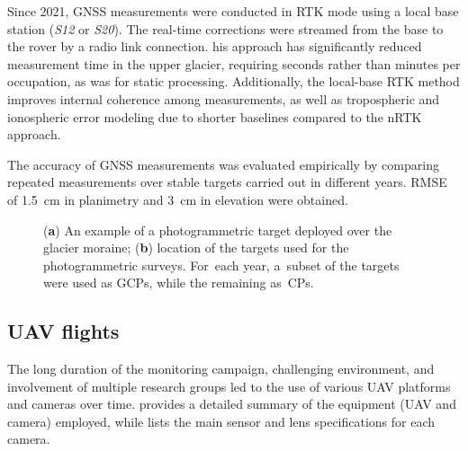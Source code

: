 Since 2021, GNSS measurements were conducted in RTK mode using a local base station 
(\textit{S12} or \textit{S20}).
The real-time corrections were streamed from the base to the rover by a radio link connection. 
his approach has significantly reduced measurement time in the upper glacier, requiring seconds 
rather than minutes per occupation, as was for static processing.
Additionally, the local-base RTK method improves internal coherence among measurements, 
as well as tropospheric and ionospheric error modeling due to shorter baselines compared to 
the nRTK approach.

The accuracy of GNSS measurements was evaluated empirically by comparing repeated
measurements over stable targets carried out in different years.
RMSE of \qty{1.5}{\centi\meter} in planimetry and \qty{3}{\centi\meter} in elevation were
obtained.


\begin{figure}
    \centering
    \caption{(\textbf{a}) An example of a photogrammetric target deployed over the
        glacier moraine; (\textbf{b}) location of the targets used for the
        photogrammetric
        surveys. For~each year, a~subset of the targets were used as GCPs, while the
        remaining
        as~CPs.}
    \label{fig:3:belvedereGCP}
\end{figure}


\subsection{UAV flights}\label{sec:3:uav-flights}

The long duration of the monitoring campaign, challenging environment, and involvement of 
multiple research groups led to the use of various UAV platforms and cameras over time. 
 provides a detailed summary of the equipment (UAV and camera) employed, while 
 lists the main sensor and lens specifications for each camera.

